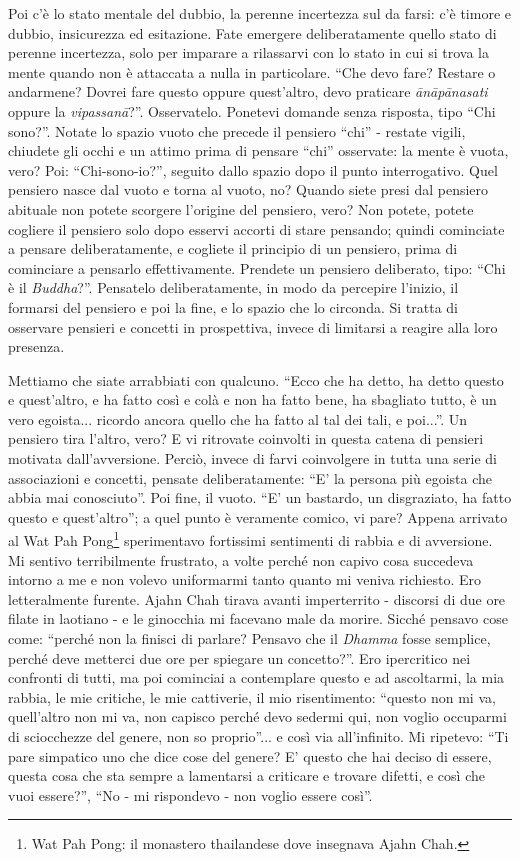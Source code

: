 Poi c'è lo stato mentale del dubbio, la perenne incertezza sul da farsi:
c'è timore e dubbio, insicurezza ed esitazione. Fate emergere
deliberatamente quello stato di perenne incertezza, solo per imparare a
rilassarvi con lo stato in cui si trova la mente quando non è attaccata
a nulla in particolare. ``Che devo fare? Restare o andarmene? Dovrei fare
questo oppure quest'altro, devo praticare \textit{ānāpānasati} oppure la
\textit{vipassanā}?''. Osservatelo. Ponetevi domande senza risposta, tipo ``Chi
sono?''. Notate lo spazio vuoto che precede il pensiero ``chi'' - restate
vigili, chiudete gli occhi e un attimo prima di pensare ``chi'' osservate:
la mente è vuota, vero? Poi: ``Chi-sono-io?'', seguito dallo spazio dopo
il punto interrogativo. Quel pensiero nasce dal vuoto e torna al vuoto,
no? Quando siete presi dal pensiero abituale non potete scorgere
l'origine del pensiero, vero? Non potete, potete cogliere il pensiero
solo dopo esservi accorti di stare pensando; quindi cominciate a pensare
deliberatamente, e cogliete il principio di un pensiero, prima di
cominciare a pensarlo effettivamente. Prendete un pensiero deliberato,
tipo: ``Chi è il \textit{Buddha}?''. Pensatelo deliberatamente, in modo da
percepire l'inizio, il formarsi del pensiero e poi la fine, e lo spazio
che lo circonda. Si tratta di osservare pensieri e concetti in
prospettiva, invece di limitarsi a reagire alla loro presenza.

Mettiamo che siate arrabbiati con qualcuno. ``Ecco che ha detto, ha detto
questo e quest'altro, e ha fatto così e colà e non ha fatto bene, ha
sbagliato tutto, è un vero egoista... ricordo ancora quello che ha fatto
al tal dei tali, e poi...''. Un pensiero tira l'altro, vero? E vi
ritrovate coinvolti in questa catena di pensieri motivata
dall'avversione. Perciò, invece di farvi coinvolgere in tutta una serie
di associazioni e concetti, pensate deliberatamente: ``E' la persona più
egoista che abbia mai conosciuto''. Poi fine, il vuoto. ``E' un bastardo,
un disgraziato, ha fatto questo e quest'altro''; a quel punto è veramente
comico, vi pare? Appena arrivato al Wat Pah Pong\footnote{Wat Pah Pong: il monastero thailandese dove insegnava
Ajahn Chah.} sperimentavo
fortissimi sentimenti di rabbia e di avversione. Mi sentivo
terribilmente frustrato, a volte perché non capivo cosa succedeva
intorno a me e non volevo uniformarmi tanto quanto mi veniva richiesto.
Ero letteralmente furente. Ajahn Chah tirava avanti imperterrito -
discorsi di due ore filate in laotiano - e le ginocchia mi facevano male
da morire. Sicché pensavo cose come: ``perché non la finisci di parlare?
Pensavo che il \textit{Dhamma} fosse semplice, perché deve metterci due ore per
spiegare un concetto?''. Ero ipercritico nei confronti di tutti, ma poi
cominciai a contemplare questo e ad ascoltarmi, la mia rabbia, le mie
critiche, le mie cattiverie, il mio risentimento: ``questo non mi va,
quell'altro non mi va, non capisco perché devo sedermi qui, non voglio
occuparmi di sciocchezze del genere, non so proprio''... e così via
all'infinito. Mi ripetevo: ``Ti pare simpatico uno che dice cose del
genere? E' questo che hai deciso di essere, questa cosa che sta sempre a
lamentarsi a criticare e trovare difetti, e così che vuoi essere?'', ``No
- mi rispondevo - non voglio essere così''.

